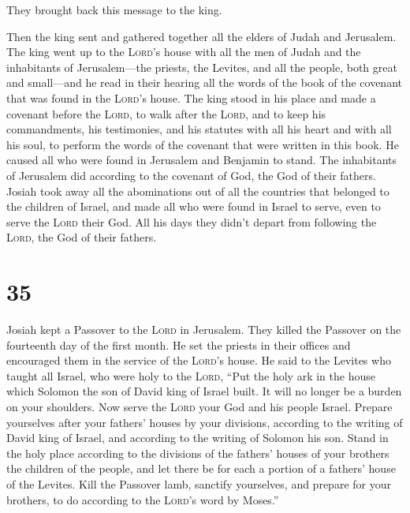 They brought back this message to the king.

 Then the king sent and gathered together all the elders
of Judah and Jerusalem.  The king went up to the
\textsc{Lord}'s house with all the men of Judah and the inhabitants of
Jerusalem---the priests, the Levites, and all the people, both great and
small---and he read in their hearing all the words of the book of the
covenant that was found in the \textsc{Lord}'s house. 
The king stood in his place and made a covenant before the
\textsc{Lord}, to walk after the \textsc{Lord}, and to keep his
commandments, his testimonies, and his statutes with all his heart and
with all his soul, to perform the words of the covenant that were
written in this book.  He caused all who were found in
Jerusalem and Benjamin to stand. The inhabitants of Jerusalem did
according to the covenant of God, the God of their fathers.
 Josiah took away all the abominations out of all the
countries that belonged to the children of Israel, and made all who were
found in Israel to serve, even to serve the \textsc{Lord} their God. All
his days they didn't depart from following the \textsc{Lord}, the God of
their fathers.

\hypertarget{section-34}{%
\section{35}\label{section-34}}

 Josiah kept a Passover to the \textsc{Lord} in Jerusalem.
They killed the Passover on the fourteenth day of the first month.
 He set the priests in their offices and encouraged them
in the service of the \textsc{Lord}'s house.  He said to
the Levites who taught all Israel, who were holy to the \textsc{Lord},
``Put the holy ark in the house which Solomon the son of David king of
Israel built. It will no longer be a burden on your shoulders. Now serve
the \textsc{Lord} your God and his people Israel.  Prepare
yourselves after your fathers' houses by your divisions, according to
the writing of David king of Israel, and according to the writing of
Solomon his son.  Stand in the holy place according to the
divisions of the fathers' houses of your brothers the children of the
people, and let there be for each a portion of a fathers' house of the
Levites.  Kill the Passover lamb, sanctify yourselves, and
prepare for your brothers, to do according to the \textsc{Lord}'s word
by Moses.''

